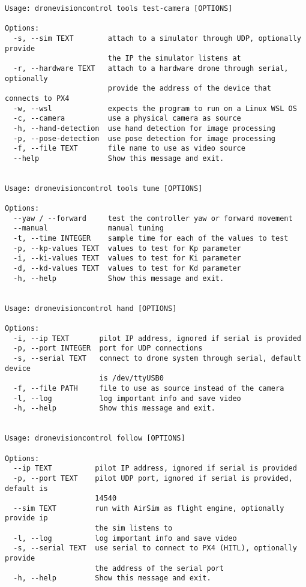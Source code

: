 \begin{verbatim}
Usage: dronevisioncontrol tools test-camera [OPTIONS]

Options:
  -s, --sim TEXT        attach to a simulator through UDP, optionally provide
                        the IP the simulator listens at
  -r, --hardware TEXT   attach to a hardware drone through serial, optionally
                        provide the address of the device that connects to PX4
  -w, --wsl             expects the program to run on a Linux WSL OS
  -c, --camera          use a physical camera as source
  -h, --hand-detection  use hand detection for image processing
  -p, --pose-detection  use pose detection for image processing
  -f, --file TEXT       file name to use as video source
  --help                Show this message and exit.


Usage: dronevisioncontrol tools tune [OPTIONS]

Options:
  --yaw / --forward     test the controller yaw or forward movement
  --manual              manual tuning
  -t, --time INTEGER    sample time for each of the values to test
  -p, --kp-values TEXT  values to test for Kp parameter
  -i, --ki-values TEXT  values to test for Ki parameter
  -d, --kd-values TEXT  values to test for Kd parameter
  -h, --help            Show this message and exit.


Usage: dronevisioncontrol hand [OPTIONS]

Options:
  -i, --ip TEXT       pilot IP address, ignored if serial is provided
  -p, --port INTEGER  port for UDP connections
  -s, --serial TEXT   connect to drone system through serial, default device
                      is /dev/ttyUSB0
  -f, --file PATH     file to use as source instead of the camera
  -l, --log           log important info and save video
  -h, --help          Show this message and exit.


Usage: dronevisioncontrol follow [OPTIONS]

Options:
  --ip TEXT          pilot IP address, ignored if serial is provided
  -p, --port TEXT    pilot UDP port, ignored if serial is provided, default is
                     14540
  --sim TEXT         run with AirSim as flight engine, optionally provide ip
                     the sim listens to
  -l, --log          log important info and save video
  -s, --serial TEXT  use serial to connect to PX4 (HITL), optionally provide
                     the address of the serial port
  -h, --help         Show this message and exit.
\end{verbatim}

